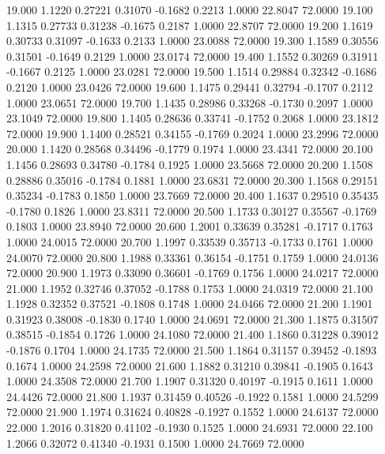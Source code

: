   19.000   1.1220   0.27221   0.31070  -0.1682   0.2213   1.0000  22.8047  72.0000
  19.100   1.1315   0.27733   0.31238  -0.1675   0.2187   1.0000  22.8707  72.0000
  19.200   1.1619   0.30733   0.31097  -0.1633   0.2133   1.0000  23.0088  72.0000
  19.300   1.1589   0.30556   0.31501  -0.1649   0.2129   1.0000  23.0174  72.0000
  19.400   1.1552   0.30269   0.31911  -0.1667   0.2125   1.0000  23.0281  72.0000
  19.500   1.1514   0.29884   0.32342  -0.1686   0.2120   1.0000  23.0426  72.0000
  19.600   1.1475   0.29441   0.32794  -0.1707   0.2112   1.0000  23.0651  72.0000
  19.700   1.1435   0.28986   0.33268  -0.1730   0.2097   1.0000  23.1049  72.0000
  19.800   1.1405   0.28636   0.33741  -0.1752   0.2068   1.0000  23.1812  72.0000
  19.900   1.1400   0.28521   0.34155  -0.1769   0.2024   1.0000  23.2996  72.0000
  20.000   1.1420   0.28568   0.34496  -0.1779   0.1974   1.0000  23.4341  72.0000
  20.100   1.1456   0.28693   0.34780  -0.1784   0.1925   1.0000  23.5668  72.0000
  20.200   1.1508   0.28886   0.35016  -0.1784   0.1881   1.0000  23.6831  72.0000
  20.300   1.1568   0.29151   0.35234  -0.1783   0.1850   1.0000  23.7669  72.0000
  20.400   1.1637   0.29510   0.35435  -0.1780   0.1826   1.0000  23.8311  72.0000
  20.500   1.1733   0.30127   0.35567  -0.1769   0.1803   1.0000  23.8940  72.0000
  20.600   1.2001   0.33639   0.35281  -0.1717   0.1763   1.0000  24.0015  72.0000
  20.700   1.1997   0.33539   0.35713  -0.1733   0.1761   1.0000  24.0070  72.0000
  20.800   1.1988   0.33361   0.36154  -0.1751   0.1759   1.0000  24.0136  72.0000
  20.900   1.1973   0.33090   0.36601  -0.1769   0.1756   1.0000  24.0217  72.0000
  21.000   1.1952   0.32746   0.37052  -0.1788   0.1753   1.0000  24.0319  72.0000
  21.100   1.1928   0.32352   0.37521  -0.1808   0.1748   1.0000  24.0466  72.0000
  21.200   1.1901   0.31923   0.38008  -0.1830   0.1740   1.0000  24.0691  72.0000
  21.300   1.1875   0.31507   0.38515  -0.1854   0.1726   1.0000  24.1080  72.0000
  21.400   1.1860   0.31228   0.39012  -0.1876   0.1704   1.0000  24.1735  72.0000
  21.500   1.1864   0.31157   0.39452  -0.1893   0.1674   1.0000  24.2598  72.0000
  21.600   1.1882   0.31210   0.39841  -0.1905   0.1643   1.0000  24.3508  72.0000
  21.700   1.1907   0.31320   0.40197  -0.1915   0.1611   1.0000  24.4426  72.0000
  21.800   1.1937   0.31459   0.40526  -0.1922   0.1581   1.0000  24.5299  72.0000
  21.900   1.1974   0.31624   0.40828  -0.1927   0.1552   1.0000  24.6137  72.0000
  22.000   1.2016   0.31820   0.41102  -0.1930   0.1525   1.0000  24.6931  72.0000
  22.100   1.2066   0.32072   0.41340  -0.1931   0.1500   1.0000  24.7669  72.0000

